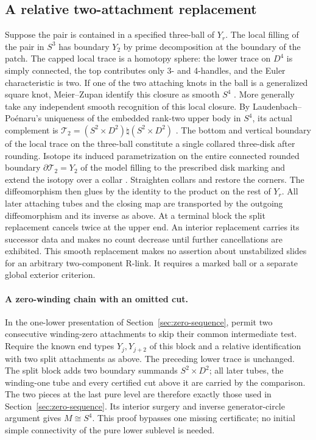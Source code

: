 \documentclass[11pt,letterpaper]{article}
\numberwithin{equation}{section}
\theoremstyle{remark}
\newcommand{\TB}[1]{\mathcal T_{#1}}
\begin{document}
\subsection{A relative two-attachment replacement}
Suppose the pair is contained in a specified three-ball of \(Y_r\).
The local filling of the pair in \(S^3\) has boundary \(Y_2\)
by prime decomposition at the boundary of the patch. The capped
local trace is a homotopy sphere: the lower trace on \(D^4\) is
simply connected, the top contributes only 3- and 4-handles,
and the Euler characteristic is two. If one of the two attaching
knots in the ball is a generalized square knot, Meier--Zupan
identify this closure as smooth \(S^4\)
\cite[Theorem 1.1]{MeierZupan2022SquareKnots}.
More generally take any independent smooth recognition of this
local closure. By Laudenbach--Po\'enaru's uniqueness of the embedded
rank-two upper body in \(S^4\), its actual complement is
\(\TB2=(S^2\times D^2)\natural(S^2\times D^2)\)
\cite[\S2, Lemma 1]{LaudenbachPoenaru1972Handlebodies}.
The bottom and vertical boundary of the local trace on the
three-ball constitute a single collared three-disk after rounding.
Isotope its induced parametrization on the entire connected rounded
boundary \(\partial\TB2=Y_2\) of the model filling to the prescribed
disk marking and extend the isotopy over a collar
\cite[Theorem B and Corollary 1]{Palais1960Extending}.
Straighten collars and restore the corners. The diffeomorphism
then glues by the identity to the product on the rest of \(Y_r\).
All later attaching tubes and the closing map are transported by
the outgoing diffeomorphism and its inverse as above. At a terminal
block the split replacement cancels twice at the upper end. An
interior replacement carries its successor data and makes no count
decrease until further cancellations are exhibited. This smooth
replacement makes no assertion about unstabilized slides for an
arbitrary two-component R-link. It requires a marked ball or a
separate global exterior criterion.


\paragraph{A zero-winding chain with an omitted cut.}
In the one-lower presentation of Section~\ref{sec:zero-sequence},
permit two consecutive winding-zero attachments to skip their common
intermediate test. Require the known end types \(Y_j,Y_{j+2}\) of
this block and a relative identification with two split attachments
as above. The preceding lower trace is unchanged. The split block
adds two boundary summands \(S^2\times D^2\); all later tubes,
the winding-one tube and every certified cut above it are carried by
the comparison. The two pieces at the last pure level are therefore
exactly those used in Section~\ref{sec:zero-sequence}. Its interior
surgery and inverse generator-circle argument gives \(M\cong S^4\).
This proof bypasses one missing certificate; no initial simple
connectivity of the pure lower sublevel is needed.
\end{document}
